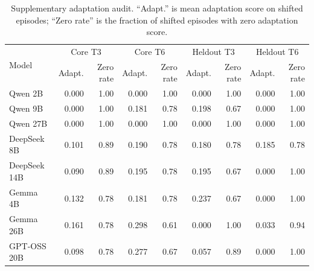 \begin{table}[t]
  \centering
  \scriptsize
  \setlength{\tabcolsep}{4pt}
  \begin{tabular}{lrrrrrrrr}
    \toprule
    \multirow{2}{*}{Model} & \multicolumn{2}{c}{Core T3} & \multicolumn{2}{c}{Core T6} & \multicolumn{2}{c}{Heldout T3} & \multicolumn{2}{c}{Heldout T6} \\
    & Adapt. & Zero rate & Adapt. & Zero rate & Adapt. & Zero rate & Adapt. & Zero rate \\
    \midrule
    Qwen 2B & 0.000 & 1.00 & 0.000 & 1.00 & 0.000 & 1.00 & 0.000 & 1.00 \\
    Qwen 9B & 0.000 & 1.00 & 0.181 & 0.78 & 0.198 & 0.67 & 0.000 & 1.00 \\
    Qwen 27B & 0.000 & 1.00 & 0.000 & 1.00 & 0.000 & 1.00 & 0.000 & 1.00 \\
    DeepSeek 8B & 0.101 & 0.89 & 0.190 & 0.78 & 0.180 & 0.78 & 0.185 & 0.78 \\
    DeepSeek 14B & 0.090 & 0.89 & 0.195 & 0.78 & 0.195 & 0.67 & 0.000 & 1.00 \\
    Gemma 4B & 0.132 & 0.78 & 0.181 & 0.78 & 0.237 & 0.67 & 0.000 & 1.00 \\
    Gemma 26B & 0.161 & 0.78 & 0.298 & 0.61 & 0.000 & 1.00 & 0.033 & 0.94 \\
    GPT-OSS 20B & 0.098 & 0.78 & 0.277 & 0.67 & 0.057 & 0.89 & 0.000 & 1.00 \\
    \bottomrule
  \end{tabular}
  \caption{Supplementary adaptation audit. ``Adapt.'' is mean adaptation score
  on shifted episodes; ``Zero rate'' is the fraction of shifted episodes with
  zero adaptation score.}
  \label{tab:adaptationaudit}
\end{table}
